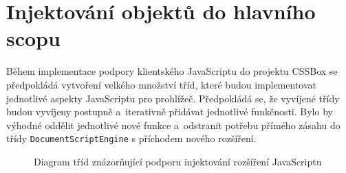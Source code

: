 \section{Injektování objektů do hlavního scopu}
\label{Chapter.Design.GlobalScopeInjections}

Během implementace podpory klientského JavaScriptu do projektu CSSBox se
předpokládá vytvoření velkého množství tříd, které budou implementovat
jednotlivé aspekty JavaScriptu pro prohlížeč. Předpokládá se, že vyvíjené třídy budou vyvíjeny postupně a~iterativně přidávat jednotlivé funkčnosti. Bylo by výhodné oddělit jednotlivé nové funkce a~odstranit potřebu přímého zásahu do třídy \texttt{DocumentScriptEngine} s příchodem nového rozšíření.

\begin{figure}[H]
  \begin{center}
    \caption{Diagram tříd znázorňující podporu injektování rozšíření JavaScriptu}
    \label{Figure.GlobalScopeInjectionsDesign}
  \end{center}
\end{figure}

